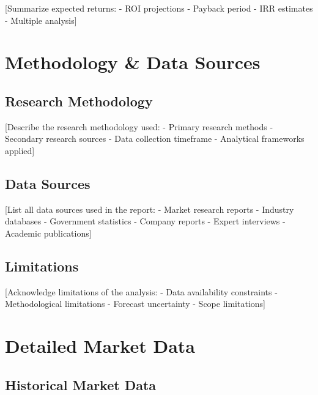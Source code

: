 \documentclass[11pt,letterpaper]{report}
\begin{document}
[Summarize expected returns:
- ROI projections
- Payback period
- IRR estimates
- Multiple analysis]

\appendix

\chapter{Methodology \& Data Sources}

\section{Research Methodology}

[Describe the research methodology used:
- Primary research methods
- Secondary research sources
- Data collection timeframe
- Analytical frameworks applied]

\section{Data Sources}

[List all data sources used in the report:
- Market research reports
- Industry databases
- Government statistics
- Company reports
- Expert interviews
- Academic publications]

\section{Limitations}

[Acknowledge limitations of the analysis:
- Data availability constraints
- Methodological limitations
- Forecast uncertainty
- Scope limitations]

\chapter{Detailed Market Data}

\section{Historical Market Data}
\end{document}
